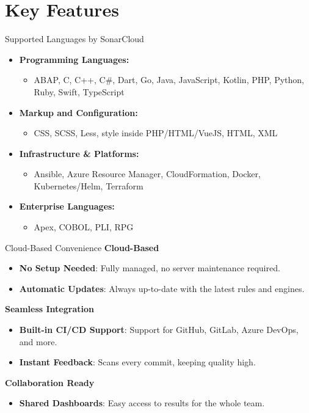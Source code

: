 \documentclass{beamer}
\begin{document}
\section[Key Features]{Key Features}

\begin{frame}{Supported Languages by SonarCloud}
  \begin{itemize}
      \item \textbf{Programming Languages:}
      \begin{itemize}
          \item ABAP, C, C++, C\#, Dart, Go, Java, JavaScript, Kotlin, PHP, Python, Ruby, Swift, TypeScript
      \end{itemize}
      \vspace*{0.5em}
        \item \textbf{Markup and Configuration:}
      \begin{itemize}
        \item CSS, SCSS, Less, style inside PHP/HTML/VueJS, HTML, XML
      \end{itemize}
      \vspace*{0.5em}
      \item \textbf{Infrastructure \& Platforms:}
      \begin{itemize}
        \item Ansible, Azure Resource Manager, CloudFormation, Docker, Kubernetes/Helm, Terraform
      \end{itemize}
      \vspace*{0.5em}
      \item \textbf{Enterprise Languages:}
      \begin{itemize}
        \item Apex, COBOL, PLI, RPG
      \end{itemize}
  \end{itemize}
\end{frame}


\begin{frame}{Cloud-Based Convenience}
  \textbf{Cloud-Based}
  \begin{itemize}
      \item \textbf{No Setup Needed}: Fully managed, no server maintenance required.
      \item \textbf{Automatic Updates}: Always up-to-date with the latest rules and engines.
  \end{itemize}
  
  \textbf{Seamless Integration}
  \begin{itemize}
      \item \textbf{Built-in CI/CD Support}: Support for GitHub, GitLab, Azure DevOps, and more.
      \item \textbf{Instant Feedback}: Scans every commit, keeping quality high.
  \end{itemize}
  
  \textbf{Collaboration Ready}
  \begin{itemize}
      \item \textbf{Shared Dashboards}: Easy access to results for the whole team.
  \end{itemize}
\end{frame}
\end{document}
